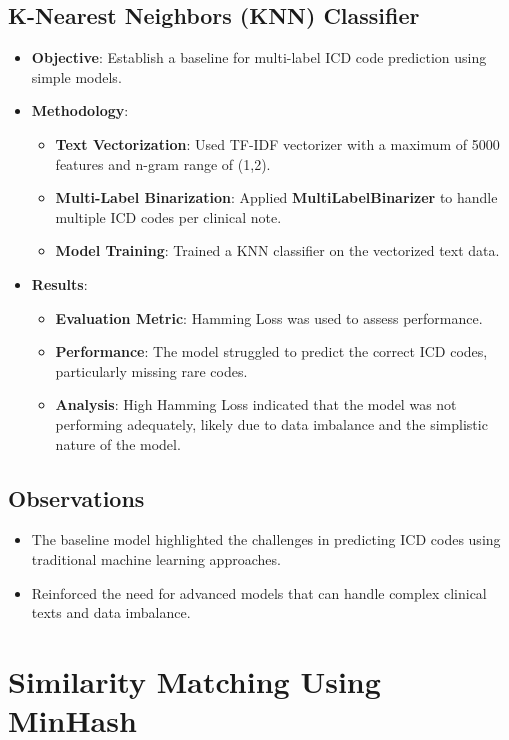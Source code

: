 \documentclass[12pt,a4paper]{report}
\begin{document}
\subsection{K-Nearest Neighbors (KNN) Classifier}
\begin{itemize}
    \item \textbf{Objective}: Establish a baseline for multi-label ICD code prediction using simple models.
    \item \textbf{Methodology}:
    \begin{itemize}
        \item \textbf{Text Vectorization}: Used TF-IDF vectorizer with a maximum of 5000 features and n-gram range of (1,2).
        \item \textbf{Multi-Label Binarization}: Applied \textbf{MultiLabelBinarizer} to handle multiple ICD codes per clinical note.
        \item \textbf{Model Training}: Trained a KNN classifier on the vectorized text data.
    \end{itemize}
    \item \textbf{Results}:
    \begin{itemize}
        \item \textbf{Evaluation Metric}: Hamming Loss was used to assess performance.
        \item \textbf{Performance}: The model struggled to predict the correct ICD codes, particularly missing rare codes.
        \item \textbf{Analysis}: High Hamming Loss indicated that the model was not performing adequately, likely due to data imbalance and the simplistic nature of the model.
    \end{itemize}
\end{itemize}

\subsection{Observations}
\begin{itemize}
    \item The baseline model highlighted the challenges in predicting ICD codes using traditional machine learning approaches.
    \item Reinforced the need for advanced models that can handle complex clinical texts and data imbalance.
\end{itemize}

\section{Similarity Matching Using MinHash}
\end{document}
